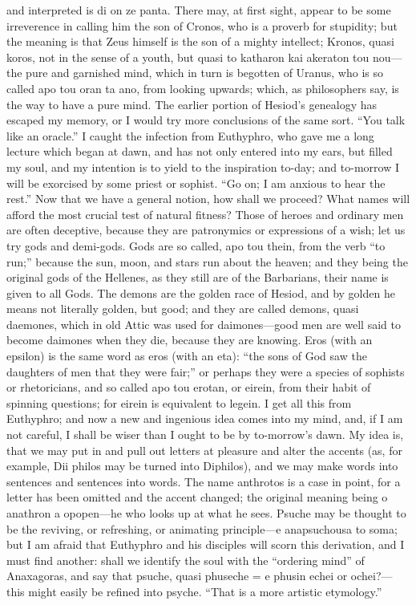 \documentclass[11pt,letter]{article}
\begin{document}
and interpreted is di on ze panta. There may, at first sight, appear to be some irreverence in calling him the son of Cronos, who is a proverb for stupidity; but the meaning is that Zeus himself is the son of a mighty intellect; Kronos, quasi koros, not in the sense of a youth, but quasi to katharon kai akeraton tou nou—the pure and garnished mind, which in turn is begotten of Uranus, who is so called apo tou oran ta ano, from looking upwards; which, as philosophers say, is the way to have a pure mind. The earlier portion of Hesiod’s genealogy has escaped my memory, or I would try more conclusions of the same sort. “You talk like an oracle.” I caught the infection from Euthyphro, who gave me a long lecture which began at dawn, and has not only entered into my ears, but filled my soul, and my intention is to yield to the inspiration to-day; and to-morrow I will be exorcised by some priest or sophist. “Go on; I am anxious to hear the rest.” Now that we have a general notion, how shall we proceed? What names will afford the most crucial test of natural fitness? Those of heroes and ordinary men are often deceptive, because they are patronymics or expressions of a wish; let us try gods and demi-gods. Gods are so called, apo tou thein, from the verb “to run;” because the sun, moon, and stars run about the heaven; and they being the original gods of the Hellenes, as they still are of the Barbarians, their name is given to all Gods. The demons are the golden race of Hesiod, and by golden he means not literally golden, but good; and they are called demons, quasi daemones, which in old Attic was used for daimones—good men are well said to become daimones when they die, because they are knowing. Eros (with an epsilon) is the same word as eros (with an eta): “the sons of God saw the daughters of men that they were fair;” or perhaps they were a species of sophists or rhetoricians, and so called apo tou erotan, or eirein, from their habit of spinning questions; for eirein is equivalent to legein. I get all this from Euthyphro; and now a new and ingenious idea comes into my mind, and, if I am not careful, I shall be wiser than I ought to be by to-morrow’s dawn. My idea is, that we may put in and pull out letters at pleasure and alter the accents (as, for example, Dii philos may be turned into Diphilos), and we may make words into sentences and sentences into words. The name anthrotos is a case in point, for a letter has been omitted and the accent changed; the original meaning being o anathron a opopen—he who looks up at what he sees. Psuche may be thought to be the reviving, or refreshing, or animating principle—e anapsuchousa to soma; but I am afraid that Euthyphro and his disciples will scorn this derivation, and I must find another: shall we identify the soul with the “ordering mind” of Anaxagoras, and say that psuche, quasi phuseche = e phusin echei or ochei?—this might easily be refined into psyche. “That is a more artistic etymology.”
\end{document}

